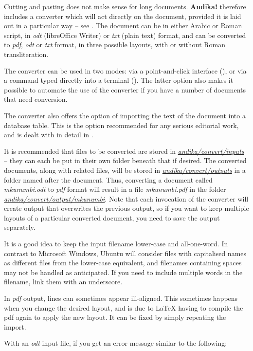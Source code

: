 Cutting and pasting does not make sense for long documents.  \textbf{Andika!} therefore includes a converter which will act directly on the document, provided it is laid out in a particular way -- see .  The document can be in either Arabic or Roman script, in \textit{odt} (libreOffice Writer) or \textit{txt} (plain text) format, and can be converted to \textit{pdf}, \textit{odt} or \textit{txt} format, in three possible layouts, with or without Roman transliteration.

The converter can be used in two modes: via a point-and-click interface (), or via a command typed directly into a terminal ().  The latter option also makes it possible to automate the use of the converter if you have a number of documents that need conversion.

The converter also offers the option of importing the text of the document into a database table.  This is the option recommended for any serious editorial work, and is dealt with in detail in .

It is recommended that files to be converted are stored in \textit{\url{andika/convert/inputs}} -- they can each be put in their own folder beneath that if desired.  The converted documents, along with related files, will be stored in \textit{\url{andika/convert/outputs}} in a folder named after the document.  Thus, converting a document called \textit{mkunumbi.odt} to \textit{pdf} format will result in a file \textit{mkunumbi.pdf} in the folder \textit{\url{andika/convert/output/mkunumbi}}.  Note that each invocation of the converter will create output that overwrites the previous output, so if you want to keep multiple layouts of a particular converted document, you need to save the output separately.

It is a good idea to keep the input filename lower-case and all-one-word.  In contrast to Microsoft Windows, Ubuntu will consider files with capitalised names as different files from the lower-case equivalent, and filenames containing spaces may not be handled as anticipated.  If you need to include multiple words in the filename, link them with an underscore.

In \textit{pdf} output, lines can sometimes appear ill-aligned.  This sometimes happens when you change the desired layout, and is due to LaTeX having to compile the pdf again to apply the new layout.  It can be fixed by simply repeating the import.  

With an \textit{odt} input file, if you get an error message similar to the following:


